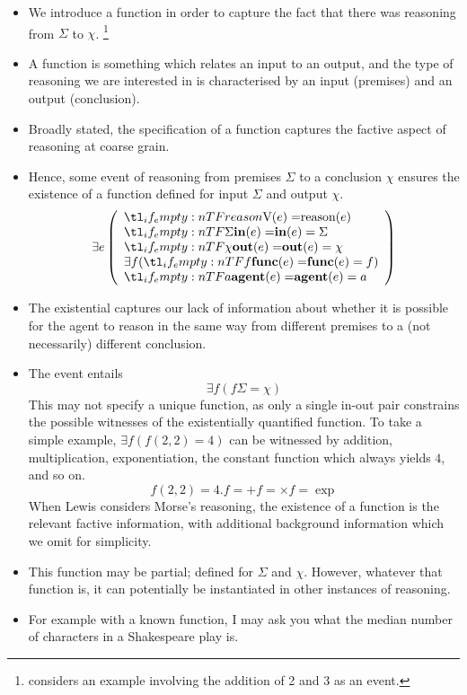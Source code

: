 \documentclass[10pt]{article}
\begin{document}
\begin{itemize}
\item We introduce a function in order to capture the fact that there was reasoning from \(\Sigma\) to \(\chi\).\nolinebreak
  \footnote{\textcite[117]{Davidson:2001aa} considers an example involving the addition of 2 and 3 as an event.}
\item A function is something which relates an input to an output, and the type of reasoning we are interested in is characterised by an input (premises) and an output (conclusion).
\item Broadly stated, the specification of a function captures the factive aspect of reasoning at coarse grain.
\item Hence, some event of reasoning from premises \(\Sigma\) to a conclusion \(\chi\) ensures the existence of a function defined for input \(\Sigma\) and output \(\chi\).
  \[
    \exists e
    \left(
      \begin{array}{l}
        \everb{reason} \\
        \ein{\Sigma} \\
        \eout{\chi} \\
        \exists f(\efunc{f}) \\
          \eagentm{a}
      \end{array}
    \right)
  \]
  \item The existential captures our lack of information about whether it is possible for the agent to reason in the same way from different premises to a (not necessarily) different conclusion.
\item The event entails
  \[
    \exists f(f\Sigma = \chi)
  \]
  This may not specify a unique function, as only a single in-out pair constrains the possible witnesses of the existentially quantified function.
  To take a simple example, \(\exists f(f(2,2) = 4)\) can be witnessed by addition, multiplication, exponentiation, the constant function which always yields \(4\), and so on.
  \[
    f(2,2) = 4.
    f = +
    f = \times
    f = \exp
  \]
  When Lewis considers Morse's reasoning, the existence of a function is the relevant factive information, with additional background information which we omit for simplicity.
\item This function may be partial; defined for \(\Sigma\) and \(\chi\).
  However, whatever that function is, it can potentially be instantiated in other instances of reasoning.
\item For example with a known function, I may ask you what the median {\color{red} number of characters in a Shakespeare play} is.

\end{itemize}
\end{document}
